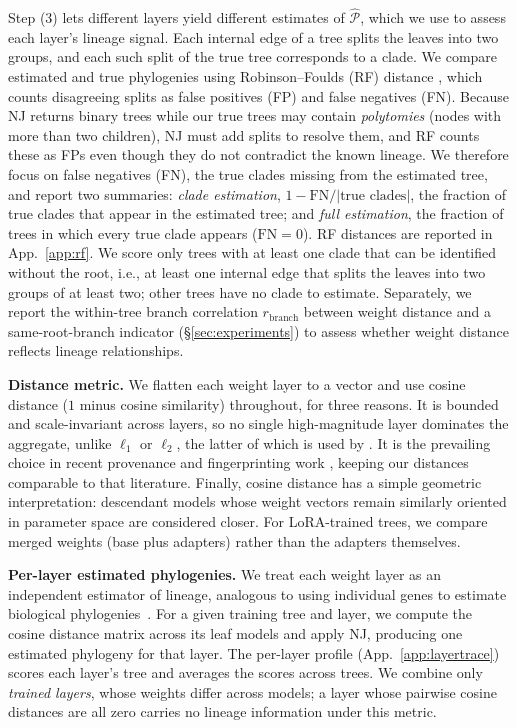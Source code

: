 \documentclass{article}
\theoremstyle{definition}
\theoremstyle{plain}
\begin{document}
Step (3) lets different layers yield different estimates of $\widehat{\mathcal{P}}$, which we use to
assess each layer's lineage signal. Each internal edge of a tree splits the leaves into two groups, and each such split of the true tree corresponds to a clade. We compare estimated and true phylogenies using Robinson--Foulds (RF) distance \citep{robinson1981comparison}, which counts disagreeing splits as false positives (FP) and false negatives (FN). Because NJ returns binary trees while our true trees may contain \textit{polytomies} (nodes with more than two children), NJ must add splits to resolve them, and RF counts these as FPs even though they do not contradict the known lineage. We therefore focus on false negatives (FN), the true clades missing from the estimated tree, and report two summaries: \emph{clade estimation}, $1-\mathrm{FN}/|\text{true clades}|$, the fraction of true clades that appear in the estimated tree; and \emph{full estimation}, the fraction of trees in which every true clade appears ($\mathrm{FN}=0$). RF distances are reported in App.~\ref{app:rf}. We score only trees with at least one clade that can be identified without the root, i.e., at least one internal edge that splits the leaves into two groups of at least two; other trees have no clade to estimate. Separately, we report the within-tree branch correlation $r_{\mathrm{branch}}$ between weight distance and a same-root-branch indicator (\S\ref{sec:experiments}) to assess whether weight distance reflects lineage relationships.



\textbf{Distance metric.}\label{sec:framework:metric}
We flatten each weight layer to a vector and use cosine distance ($1$ minus cosine
similarity) throughout, for three reasons. It is bounded and scale-invariant across layers, so no single
high-magnitude layer dominates the aggregate, unlike $\ell_1$ or $\ell_2$, the latter of which is used by \citet{horwitz2025mother}. It is the prevailing choice in
recent provenance and fingerprinting work \citep{zeng2024huref, behavioral2026provenance,
zhu2025independence}, keeping our distances comparable to that literature. Finally, cosine distance has a simple geometric interpretation: descendant models whose weight vectors remain similarly oriented in parameter space are considered closer. For LoRA-trained trees, we compare merged weights (base plus adapters) rather than the adapters themselves.



\textbf{Per-layer estimated phylogenies.}
We treat each weight layer as an independent estimator of lineage, analogous to using individual
genes to estimate biological phylogenies~\citep{maddison1997gene}. For a given training tree and
layer, we compute the cosine distance matrix across its leaf models and apply NJ, producing one
estimated phylogeny for that layer. The per-layer profile (App.~\ref{app:layertrace}) scores each layer's tree and averages the scores across trees. We combine only \emph{trained layers}, whose weights differ across models; a layer whose pairwise cosine distances are all zero carries no lineage information under this metric.
\end{document}
